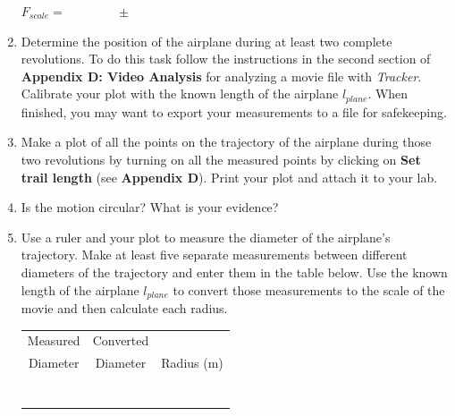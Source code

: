 \begin{enumerate}
\hspace{0.5in} $F_{scale} = \qquad\qquad \pm$

\vspace{5mm}

\item Determine the position of the airplane during at least two complete revolutions. To
do this task follow the instructions in the second section of \textbf{Appendix D: Video Analysis} 
for analyzing a movie file with {\it Tracker}.
Calibrate your plot with the known length of the airplane $l_{plane}$.
When finished, you may want to export your measurements to a file for safekeeping.

\item Make a plot of all the points on the trajectory of the airplane during those two  revolutions  
by turning on all the measured points by clicking on {\bf Set trail length} (see {\bf Appendix D}).
Print your plot and attach it to your lab.

\item Is the motion circular? What is your evidence?
\vspace{10mm}

\item Use a ruler and your plot to measure the diameter of the airplane's trajectory.
Make at least five separate measurements between different diameters of the trajectory
and enter them in the table below.
Use the known length of the airplane $l_{plane}$ to convert those measurements to the scale of
the movie and then calculate each radius.

\begin{table}[h!]
\begin{center}
\begin{tabular}{|c|c|c|} \hline
Measured  &  Converted  &            \\
Diameter  &  Diameter   & Radius (m) \\ \hline
          &             &            \\
          &             &            \\
          &             &            \\
          &             &            \\
          &             &            \\
          &             &            \\
          &             &            \\ \hline
\end{tabular}
\end{center}
\end{table}


\end{enumerate}
